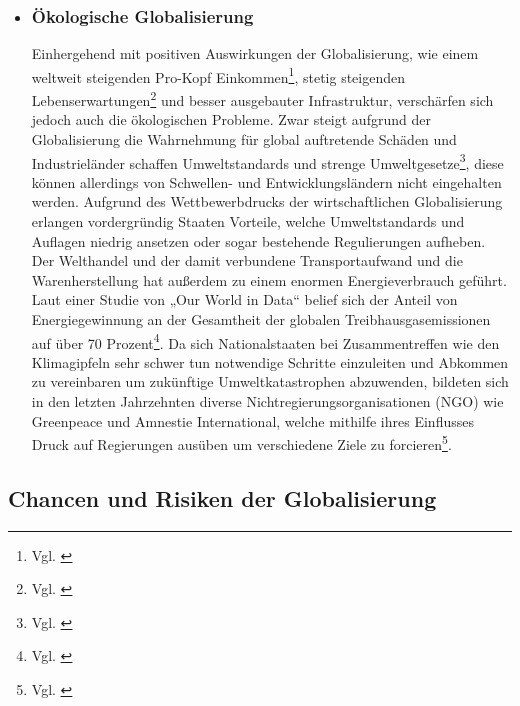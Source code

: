 \documentclass[12pt]{article}
\begin{document}
\begin{itemize}
\begin{sloppypar}
    \end{sloppypar}
    \item \subsubsection{Ökologische Globalisierung}\label{sec:oekologGlob}
    Einhergehend mit positiven Auswirkungen der Globalisierung, wie einem weltweit steigenden Pro-Kopf Einkommen\footnote{Vgl. \cite{Lammar2013}}, stetig steigenden Lebenserwartungen\footnote{Vgl. \cite{Radtke2021}} und besser ausgebauter Infrastruktur, verschärfen sich jedoch auch die ökologischen Probleme. Zwar steigt aufgrund der Globalisierung die Wahrnehmung für global auftretende Schäden und Industrieländer schaffen Umweltstandards und strenge Umweltgesetze\footnote{Vgl. \cite{WikipGlobWirtsch}}, diese können allerdings von Schwellen- und Entwicklungsländern nicht eingehalten werden. Aufgrund des Wettbewerbdrucks der wirtschaftlichen Globalisierung erlangen vordergründig Staaten Vorteile, welche Umweltstandards und Auflagen niedrig ansetzen oder sogar bestehende Regulierungen aufheben. Der Welthandel und der damit verbundene Transportaufwand und die Warenherstellung hat außerdem zu einem enormen Energieverbrauch geführt. Laut einer Studie von „Our World in Data“ belief sich der Anteil von Energiegewinnung an der Gesamtheit der globalen Treibhausgasemissionen auf über 70 Prozent\footnote{Vgl. \cite{Ritchie2021}}. Da sich Nationalstaaten bei Zusammentreffen wie den Klimagipfeln sehr schwer tun notwendige Schritte einzuleiten und Abkommen zu vereinbaren um zukünftige Umweltkatastrophen abzuwenden, bildeten sich in den letzten Jahrzehnten diverse Nichtregierungsorganisationen (NGO) wie Greenpeace und Amnestie International, welche mithilfe ihres Einflusses Druck auf Regierungen ausüben um verschiedene Ziele zu forcieren\footnote{Vgl. \cite{Ehrlich1966} }.
\end{itemize}
\subsection{Chancen und Risiken der Globalisierung}
\end{document}
